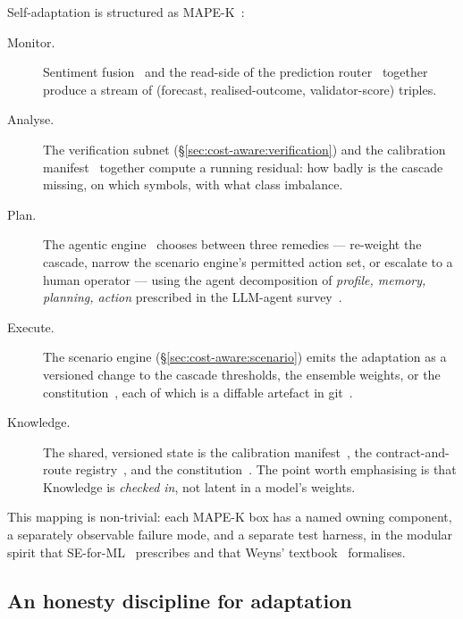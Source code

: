 \documentclass[11pt,a4paper]{article}
\begin{document}
Self-adaptation is structured as MAPE-K~\cite{salehie2009self}:
\begin{description}
  \item[Monitor.]
        Sentiment fusion~\cite{macrocosmos2024datauniverse,birdeye2026docs,dexscreener2026docs,yang2023fingpt,wu2023bloomberggpt,gandhi2023multimodal,lai2023multimodal,long2019deep,zhang2025sentistack}
        and the read-side of the prediction
        router~\cite{omnirisk2026predmetrics} together produce a stream
        of (forecast, realised-outcome, validator-score) triples.
  \item[Analyse.]
        The verification subnet (\S\ref{sec:cost-aware:verification})
        and the calibration
        manifest~\cite{omnirisk2026calibration} together compute a
        running residual: how badly is the cascade missing, on which
        symbols, with what class imbalance.
  \item[Plan.]
        The agentic engine~\cite{wang2024survey,bai2022constitutional}
        chooses between three remedies --- re-weight the cascade, narrow
        the scenario engine's permitted action set, or escalate to a
        human operator --- using the agent decomposition of
        \emph{profile, memory, planning, action} prescribed in the
        LLM-agent survey~\cite{wang2024survey}.
  \item[Execute.]
        The scenario engine (\S\ref{sec:cost-aware:scenario}) emits the
        adaptation as a versioned change to the cascade thresholds, the
        ensemble weights, or the
        constitution~\cite{bai2022constitutional}, each of which is a
        diffable artefact in
        git~\cite{omnirisk2026systemdesign,omnirisk2026agentic}.
  \item[Knowledge.]
        The shared, versioned state is the calibration
        manifest~\cite{omnirisk2026calibration,omnirisk2026predmetrics},
        the contract-and-route
        registry~\cite{rayachain2026registry}, and the
        constitution~\cite{bai2022constitutional}. The point worth
        emphasising is that Knowledge is \emph{checked in}, not
        latent in a model's weights.
\end{description}
This mapping is non-trivial: each MAPE-K box has a named owning
component, a separately observable failure mode, and a separate test
harness, in the modular spirit that
SE-for-ML~\cite{sculley2015hidden,amershi2019software} prescribes and
that Weyns' textbook~\cite{weyns2020introduction} formalises.

\subsection{An honesty discipline for adaptation}\label{sec:self-adaptive:honesty}
\end{document}

